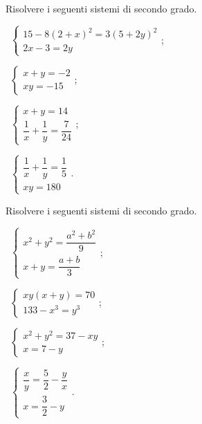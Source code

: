 \begin{esercizio}[\Ast]
\label{ese:6.12}
Risolvere i seguenti sistemi di secondo grado.
\begin{multicols}{2}
 \begin{enumeratea}
 \item~$\left\{\begin{array}{l}15-8(2+x)^{2}=3(5+2y)^{2}\\2x-3=2y\end{array}\right.$;
 \item~$\left\{\begin{array}{l}x+y=-2\\xy=-15\end{array}\right.$;
 \item~$\left\{\begin{array}{l}x+y=14\\\dfrac{1}{x}+\dfrac{1}{y}=\dfrac{7}{24}\end{array}\right.$;
 \item~$\left\{\begin{array}{l}\dfrac{1}{x}+\dfrac{1}{y}=\dfrac{1}{5}\\xy=180\end{array}\right.$.
 \end{enumeratea}
 \end{multicols}
\end{esercizio}

\begin{esercizio}[\Ast]
\label{ese:6.13}
Risolvere i seguenti sistemi di secondo grado.
\begin{multicols}{2}
 \begin{enumeratea}
 \item~$\left\{\begin{array}{l}x^{2}+y^{2}=\dfrac{a^{2}+b^{2}}{9}\\x+y=\dfrac{a+b}{3}\end{array}\right.$;
 \item~$\left\{\begin{array}{l}xy(x+y)=70\\133-x^{3}=y^{3}\end{array}\right.$;
 \item~$\left\{\begin{array}{l}x^{2}+y^{2}=37-xy\\x=7-y\end{array}\right.$;
 \item~$\left\{\begin{array}{l}\dfrac{x}{y}=\dfrac{5}{2}-\dfrac{y}{x}\\x=\dfrac{3}{2}-y\end{array}\right.$.
 \end{enumeratea}
 \end{multicols}
\end{esercizio}

